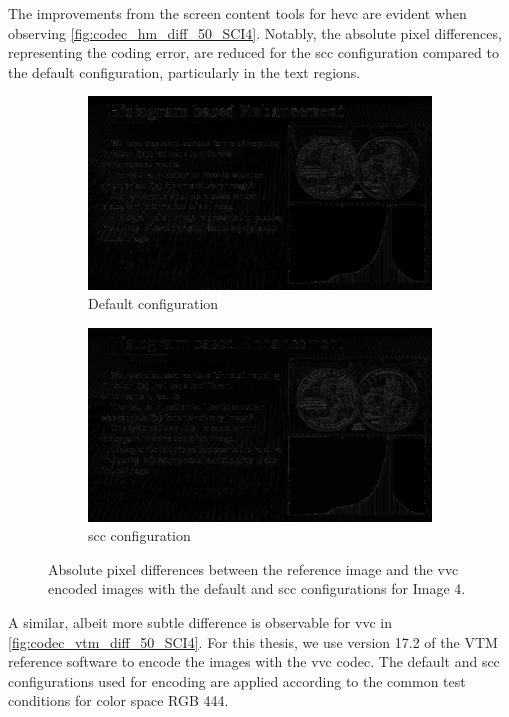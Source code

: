 The improvements from the screen content tools for \gls{hevc} are evident when observing \autoref{fig:codec_hm_diff_50_SCI4}.
Notably, the absolute pixel differences, representing the coding error, are reduced for the \gls{scc} configuration compared to the default configuration, particularly in the text regions.
\begin{figure}
    \centering
    \begin{subfigure}[b]{0.45\textwidth}
        \includegraphics[width=\linewidth]{../images/codec_vtm_default_diff_50_SCI4.png}
        \caption{Default configuration}
        \label{fig:codec_vtm_default_diff_50_SCI4}
    \end{subfigure}
    \hfill
    \begin{subfigure}[b]{0.45\textwidth}
        \includegraphics[width=\linewidth]{../images/codec_vtm_scc_diff_50_SCI4.png}
        \caption{\gls{scc} configuration}
        \label{fig:codec_vtm_scc_diff_50_SCI4}
    \end{subfigure}
    \caption{Absolute pixel differences between the reference image and the \gls{vvc} encoded images with the default and \gls{scc} configurations for Image 4.}
    \label{fig:codec_vtm_diff_50_SCI4}
\end{figure}
A similar, albeit more subtle difference is observable for \gls{vvc} in \autoref{fig:codec_vtm_diff_50_SCI4}.
For this thesis, we use version 17.2 of the VTM reference software \cite{vvc_software_2022} to encode the images with the \gls{vvc} codec.
The default and \gls{scc} \cite{config_vvc_both_2020} configurations used for encoding are applied according to the common test conditions for color space RGB 444.


